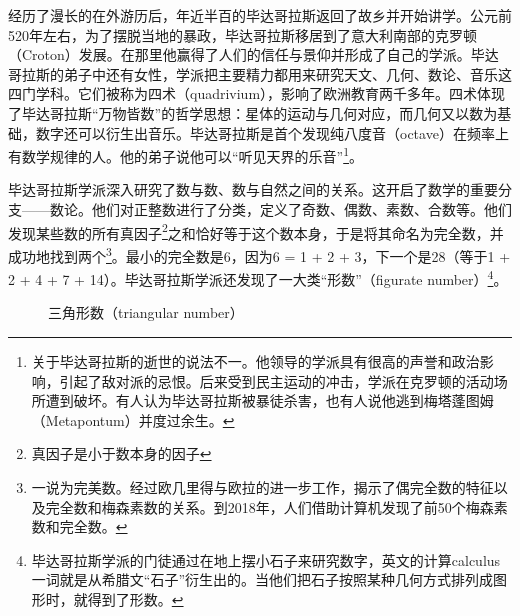 \documentclass[UTF8]{article}
\begin{document}
经历了漫长的在外游历后，年近半百的毕达哥拉斯返回了故乡并开始讲学。公元前520年左右，为了摆脱当地的暴政，毕达哥拉斯移居到了意大利南部的克罗顿（Croton）发展。在那里他赢得了人们的信任与景仰并形成了自己的学派。毕达哥拉斯的弟子中还有女性，学派把主要精力都用来研究天文、几何、数论、音乐这四门学科。它们被称为四术（quadrivium），影响了欧洲教育两千多年\cite{StepanovRose15}。四术体现了毕达哥拉斯“万物皆数”的哲学思想：星体的运动与几何对应，而几何又以数为基础，数字还可以衍生出音乐。毕达哥拉斯是首个发现纯八度音（octave）在频率上有数学规律的人。他的弟子说他可以“听见天界的乐音”\footnote{关于毕达哥拉斯的逝世的说法不一。他领导的学派具有很高的声誉和政治影响，引起了敌对派的忌恨。后来受到民主运动的冲击，学派在克罗顿的活动场所遭到破坏。有人认为毕达哥拉斯被暴徒杀害，也有人说他逃到梅塔蓬图姆（Metapontum）并度过余生。}。

毕达哥拉斯学派深入研究了数与数、数与自然之间的关系。这开启了数学的重要分支——数论。他们对正整数进行了分类，定义了奇数、偶数、素数、合数等。他们发现某些数的所有真因子\footnote{真因子是小于数本身的因子}之和恰好等于这个数本身，于是将其命名为完全数，并成功地找到两个\footnote{一说为完美数。经过欧几里得与欧拉的进一步工作，揭示了偶完全数的特征以及完全数和梅森素数的关系。到2018年，人们借助计算机发现了前50个梅森素数和完全数。}。最小的完全数是6，因为6 = 1 + 2 + 3，下一个是28（等于1 + 2 + 4 + 7 + 14）。毕达哥拉斯学派还发现了一大类“形数”（figurate number）\footnote{毕达哥拉斯学派的门徒通过在地上摆小石子来研究数字，英文的计算calculus一词就是从希腊文“石子”衍生出的\cite{HanXueTao16}。当他们把石子按照某种几何方式排列成图形时，就得到了形数。}。

\begin{figure}[htbp]
\centering
{}
\caption{三角形数（triangular number）}
\label{fig:triangular-num}
\end{figure}
\end{document}
